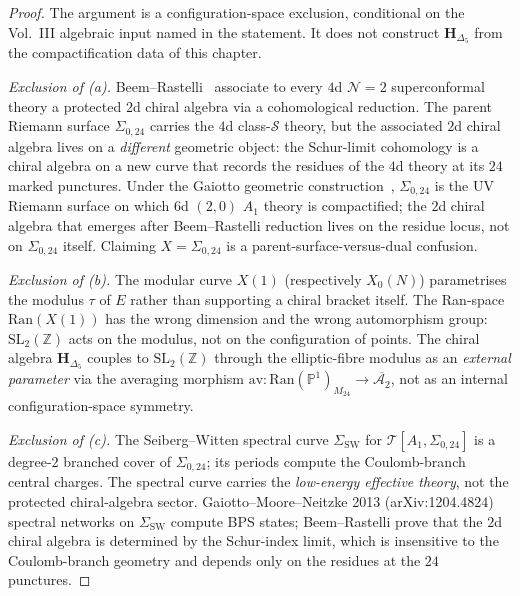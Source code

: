 \begin{proof}
The argument is a configuration-space exclusion, conditional on the
Vol.~III algebraic input named in the statement. It does not construct
$\mathbf H_{\Delta_5}$ from the compactification data of this chapter.

\emph{Exclusion of \textup{(a)}.} Beem--Rastelli~\cite{BeemRastelli2013}
associate to every $4$d $\mathcal{N}=2$ superconformal theory a protected
$2$d chiral algebra via a cohomological reduction. The parent Riemann
surface $\Sigma_{0,24}$ carries the $4$d class-$\mathcal{S}$ theory, but
the associated $2$d chiral algebra lives on a \emph{different} geometric
object: the Schur-limit cohomology is a chiral algebra on a new curve
that records the residues of the $4$d theory at its $24$ marked punctures.
Under the Gaiotto geometric construction~\cite{Gaiotto2009},
$\Sigma_{0,24}$ is the UV Riemann surface on which $6$d $(2,0)$ $A_1$
theory is compactified; the $2$d chiral algebra that emerges after
Beem--Rastelli reduction lives on the residue locus, not on $\Sigma_{0,24}$
itself. Claiming $X = \Sigma_{0,24}$ is a parent-surface-versus-dual
confusion.

\emph{Exclusion of \textup{(b)}.} The modular curve $X(1)$ (respectively
$X_0(N)$) parametrises the modulus $\tau$ of $E$ rather than supporting
a chiral bracket itself. The Ran-space $\mathrm{Ran}(X(1))$ has the wrong
dimension and the wrong automorphism group: $\mathrm{SL}_2(\mathbb{Z})$
acts on the modulus, not on the configuration of points. The chiral
algebra $\mathbf{H}_{\Delta_5}$ couples to $\mathrm{SL}_2(\mathbb{Z})$
through the elliptic-fibre modulus as an \emph{external parameter} via
the averaging morphism $\mathrm{av}\colon
\mathrm{Ran}(\mathbb{P}^1)_{M_{24}}\to\overline{\mathcal{A}_2}$, not as
an internal configuration-space symmetry.

\emph{Exclusion of \textup{(c)}.} The Seiberg--Witten spectral curve
$\Sigma_{\mathrm{SW}}$ for $\mathcal{T}[A_1,\Sigma_{0,24}]$ is a
degree-$2$ branched cover of $\Sigma_{0,24}$; its periods compute the
Coulomb-branch central charges. The spectral curve carries the
\emph{low-energy effective theory}, not the protected chiral-algebra
sector. Gaiotto--Moore--Neitzke 2013 (arXiv:1204.4824) spectral networks
on $\Sigma_{\mathrm{SW}}$ compute BPS states; Beem--Rastelli
\cite{BeemRastelli2013} prove that the $2$d chiral algebra is determined
by the Schur-index limit, which is insensitive to the Coulomb-branch
geometry and depends only on the residues at the $24$ punctures.


\end{proof}
